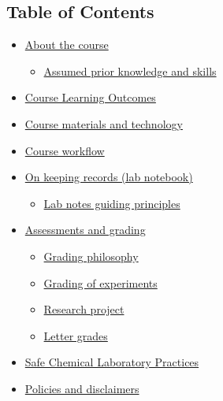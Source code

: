 \subsection{\texorpdfstring{Table of Contents
}{Table of Contents }}\label{table-of-contents}

\begin{itemize}
\tightlist
\item
  \hyperref[about-the-course]{About the course}

  \begin{itemize}
  \tightlist
  \item
    \hyperref[assumed-prior-knowledge-and-skills]{Assumed prior
    knowledge and skills}
  \end{itemize}
\item
  \hyperref[course-learning-outcomes]{Course Learning Outcomes}
\item
  \hyperref[course-materials-and-technology]{Course materials and
  technology}
\item
  \hyperref[course-workflow]{Course workflow}
\item
  \hyperref[on-keeping-records-lab-notebook]{On keeping records (lab
  notebook)}

  \begin{itemize}
  \tightlist
  \item
    \hyperref[lab-notes-guiding-principles]{Lab notes guiding
    principles}
  \end{itemize}
\item
  \hyperref[assessments-and-grading]{Assessments and grading}

  \begin{itemize}
  \tightlist
  \item
    \hyperref[grading-philosophy]{Grading philosophy}
  \item
    \hyperref[grading-of-experiments]{Grading of experiments}
  \item
    \hyperref[research-project]{Research project}
  \item
    \hyperref[letter-grades]{Letter grades}
  \end{itemize}
\item
  \hyperref[safe-chemical-laboratory-practices]{Safe Chemical Laboratory
  Practices}
\item
  \hyperref[policies-and-disclaimers]{Policies and disclaimers}


\end{itemize}
